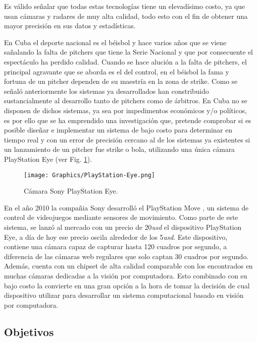 Es válido señalar que todas estas tecnologías tiene un elevadísimo costo, ya que usan cámaras y radares de muy alta calidad, todo esto con el fin de obtener una mayor precisión en sus datos y estadísticas.

En Cuba el deporte nacional es el béisbol y hace varios años que se viene sañalando la falta de pitchers que tiene la Serie Nacional y que por consecuente el espectáculo ha perdido calidad. Cuando se hace alución a la falta de pitchers, el principal agravante que se aborda es el del control, en el béisbol la fama y fortuna de un pitcher dependen de su maestría en la zona de strike. Como se señaló anteriormente los sistemas ya desarrollados han constribuido sustancialmente al desarrollo tanto de pitchers como de árbitros. En Cuba no se disponen de dichos sistemas, ya sea por impedimentos económicos y/o políticos, es por ello que se ha emprendido una investigación que, pretende comprobar si es posible diseñar e implementar un sistema de bajo costo para determinar en tiempo real y con un error de precisión cercano al de los sistemas ya existentes si un lanzamiento de un pitcher fue strike o bola, utilizando una única cámara PlayStation Eye \cite{PlayStationEye} (ver Fig. \ref{fig:PlayStationEye}).

\begin{figure}[!h]
    \centering
    \texttt{[image: Graphics/PlayStation-Eye.png]}
    \caption{Cámara Sony PlayStation Eye.}
    \label{fig:PlayStationEye}
\end{figure}

En el año 2010 la compañia Sony desarrolló el PlayStation Move \cite{PlayStationMove}, un sistema de control de videojuegos mediante sensores de movimiento. Como parte de este sistema, se lanzó al mercado con un precio de 20\textit{usd} el dispositivo PlayStation Eye, a día de hoy ese precio oscila alrededor de los 5\textit{usd}. Este dispositivo, contiene una cámara capaz de capturar hasta 120 cuadros por segundo, a diferencia de las cámaras web regulares que solo captan 30 cuadros por segundo. Además, cuenta con un chipset de alta calidad comparable con los encontrados en muchas cámaras dedicadas a la visión por computadora. Esto combinado con su bajo costo la convierte en una gran opción a la hora de tomar la decisión de cual dispositivo utilizar para desarrollar un sistema computacional basado en visión por computadora.

\subsection*{Objetivos}

